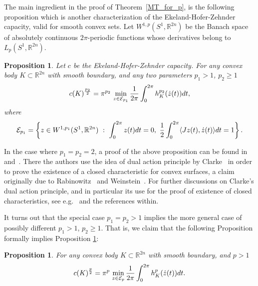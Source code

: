 \documentclass[12pt]{article}
\newtheorem{proposition}[lemma]{Proposition}
\begin{document}
The main ingredient in the proof of Theorem~\ref{MT_for_p}, is the
following proposition which is another characterization of the
Ekeland-Hofer-Zehnder capacity, valid for smooth convex sets. Let
$W^{1,p}(S^1,{\mathbb R}^{2n})$ be the Banach space of absolutely
continuous $2 \pi$-periodic functions whose derivatives belong to
$L_p(S^1,{\mathbb R}^{2n})$.


\begin{proposition} \label{main_prop}
Let $c$ be the Ekeland-Hofer-Zehnder capacity. For any convex body $K \subset
{\mathbb R}^{2n}$ with smooth boundary, and any two parameters $p_1
> 1$, $p_2 \geq 1$
%
\begin{equation}\label{ep}
 c(K)^{\frac {p_2} 2 }= \pi^{p_2} \, \min_{z \in
{\cal E}_{p_1}}
  {\frac 1 {2 \pi}} \int_0^{2 \pi} h_K^{p_2}(\dot{z}(t))dt ,\end{equation}
where $$ {\cal E}_{p_1} = \left \{ z \in W^{1,p_1}(S^1,{\mathbb
R}^{2n}) \ : \  \int_0^{2 \pi} z(t) dt = 0, \  {\frac 1 2} \int_0^{2
\pi} \langle Jz(t), \dot{z}(t) \rangle dt = 1 \right \}.$$
\end{proposition}



In the case where $p_1=p_2=2$, a proof of the above proposition can
be found in~\cite{HZ} and~\cite{MZ}. There the authors use the idea
of dual action principle by Clarke~\cite{C} in order to prove the
existence of a closed characteristic for convex surfaces, a claim
originally due to Rabinowitz~\cite{R} and Weinstein~\cite{W}. For
further discussions on Clarke's dual action principle, and in
particular its use for the proof of existence of closed
characteristics, see e.g.~\cite{Ek} and the references within.

It turns out that the special case $p_1 = p_2 >1$ implies the more
general case of possibly different $p_1>1$, $p_2\ge 1$. That is, we
claim that the following Proposition formally implies Proposition
\ref{main_prop}:

\begin{proposition} \label{special_case_of_main_prop}
For any convex body $K \subset {\mathbb R}^{2n}$ with smooth
boundary, and $p > 1$
\begin{equation}
 c(K)^{\frac {p} 2 }= \pi^{p} \, \min_{z \in
{\cal E}_{p}}
  {\frac 1 {2 \pi}} \int_0^{2 \pi} h_K^{p}(\dot{z}(t))dt.\end{equation}
 \end{proposition}
\end{document}
